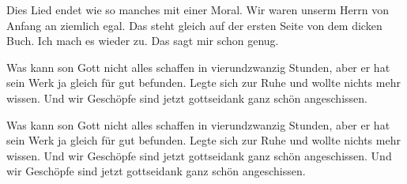 \begin{guitar}
	[Am]  [Am] [E] [Am] 

    Dies Lied endet wie so manches mit einer Moral. 
    Wir waren unserm Herrn von Anfang an ziemlich egal. 
    Das steht gleich auf der ersten Seite von dem dicken Buch. 
    Ich mach es wieder zu. Das sagt mir schon genug.


    Was kann son Gott nicht alles schaffen in vierundzwanzig Stunden, 
    aber er hat sein Werk ja gleich für gut befunden. 
    Legte sich zur Ruhe und wollte nichts mehr wissen. 
    Und wir Geschöpfe sind jetzt gottseidank ganz schön angeschissen. 


    Was kann son Gott nicht alles schaffen in vierundzwanzig Stunden, 
    aber er hat sein Werk ja gleich für gut befunden. 
    Legte sich zur Ruhe und wollte nichts mehr wissen. 
    Und wir Geschöpfe sind jetzt gottseidank ganz schön angeschissen. 
    Und wir Geschöpfe sind jetzt gottseidank ganz schön angeschissen. 

    
\end{guitar}
